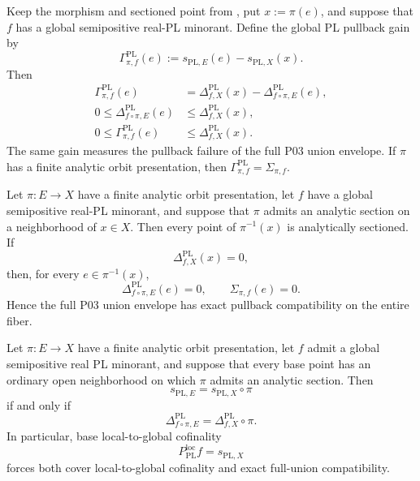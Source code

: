 \begin{theorem}
\label{thm:p031-sectioned-globalization-balance}
Keep the morphism and sectioned point from
, put $x:=\pi(e)$, and suppose
that $f$ has a global semipositive real-PL minorant.  Define the global PL
pullback gain by
\begin{equation}
\label{eq:p031-global-pl-pullback-gain}
 \Gamma^{\mathrm{PL}}_{\pi,f}(e)
   :=s_{\mathrm{PL},E}(e)-s_{\mathrm{PL},X}(x).
\end{equation}
Then
\begin{align}
 \Gamma^{\mathrm{PL}}_{\pi,f}(e)
   &=\Delta^{\mathrm{PL}}_{f,X}(x)
      -\Delta^{\mathrm{PL}}_{f\circ\pi,E}(e),
\label{eq:p031-sectioned-globalization-balance}\\
 0\leq\Delta^{\mathrm{PL}}_{f\circ\pi,E}(e)
   &\leq\Delta^{\mathrm{PL}}_{f,X}(x),
\label{eq:p031-sectioned-defect-contraction}\\
 0\leq\Gamma^{\mathrm{PL}}_{\pi,f}(e)
   &\leq\Delta^{\mathrm{PL}}_{f,X}(x).
\label{eq:p031-sectioned-gain-bound}
\end{align}
The same gain measures the pullback failure of the full P03 union envelope.
If $\pi$ has a finite analytic orbit presentation, then
$\Gamma^{\mathrm{PL}}_{\pi,f}=\Sigma_{\pi,f}$.
\end{theorem}

\begin{corollary}
\label{cor:p031-local-section-orbit-fiber-closure}
Let $\pi:E\to X$ have a finite analytic orbit presentation, let $f$ have a
global semipositive real-PL minorant, and suppose that $\pi$ admits an
analytic section on a neighborhood of $x\in X$.  Then every point of
$\pi^{-1}(x)$ is
analytically sectioned.  If
\begin{equation}
\label{eq:p031-zero-base-globalization-defect}
                  \Delta^{\mathrm{PL}}_{f,X}(x)=0,
\end{equation}
then, for every $e\in\pi^{-1}(x)$,
\begin{equation}
\label{eq:p031-zero-fiber-globalization-defects}
 \Delta^{\mathrm{PL}}_{f\circ\pi,E}(e)=0,
 \qquad
 \Sigma_{\pi,f}(e)=0.
\end{equation}
Hence the full P03 union envelope has exact pullback compatibility on the
entire fiber.
\end{corollary}

\begin{corollary}
\label{cor:p031-local-section-defect-preservation}
Let $\pi\colon E\to X$ have a finite analytic orbit presentation, let $f$
admit a global semipositive real PL minorant, and suppose that every base
point has an ordinary open neighborhood on which $\pi$ admits an analytic
section.  Then
\[
                 s_{\mathrm{PL},E}
                    =s_{\mathrm{PL},X}\circ\pi
\]
if and only if
\begin{equation}
\label{eq:p031-globalization-defect-preservation}
 \Delta^{\mathrm{PL}}_{f\circ\pi,E}
    =\Delta^{\mathrm{PL}}_{f,X}\circ\pi.
\end{equation}
In particular, base local-to-global cofinality
\[
           P_{\mathrm{PL}}^{\mathrm{loc}}f=s_{\mathrm{PL},X}
\]
forces both cover local-to-global cofinality and exact full-union
compatibility.
\end{corollary}
